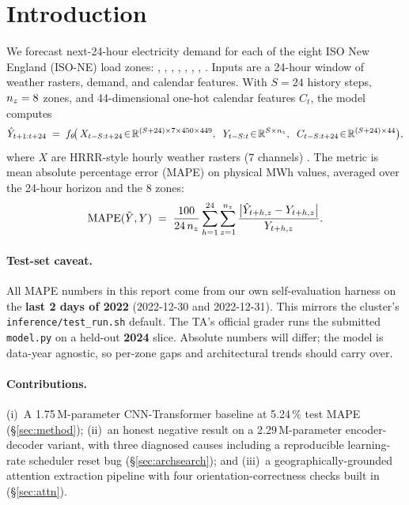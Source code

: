 \documentclass[11pt,letterpaper]{article}
\begin{document}
\maketitle
\thispagestyle{empty}

\section{Introduction}
\label{sec:intro}

We forecast next-24-hour electricity demand for each of the eight ISO New England (ISO-NE) load zones: , , , , , , , . Inputs are a 24-hour window of weather rasters, demand, and calendar features. With $S=24$ history steps, $n_{z}=8$ zones, and 44-dimensional one-hot calendar features $C_t$, the model computes
\begin{equation}
    \hat Y_{t+1:t+24} \;=\; f_\theta\!\bigl(\, X_{t-S:t+24}\!\in\!\mathbb{R}^{(S+24)\times 7\times 450\times 449},\;\; Y_{t-S:t}\!\in\!\mathbb{R}^{S\times n_{z}},\;\; C_{t-S:t+24}\!\in\!\mathbb{R}^{(S+24)\times 44}\bigr),
    \label{eq:task}
\end{equation}
where $X$ are HRRR-style hourly weather rasters (7 channels) \citep{benjamin2016hrrr}. The metric is mean absolute percentage error (MAPE) on physical MWh values, averaged over the 24-hour horizon and the 8 zones:
\begin{equation}
    \mathrm{MAPE}(\hat Y, Y) \;=\; \frac{100}{24\,n_{z}}\sum_{h=1}^{24}\sum_{z=1}^{n_{z}}\frac{\bigl|\hat Y_{t+h,z}-Y_{t+h,z}\bigr|}{Y_{t+h,z}}.
    \label{eq:mape}
\end{equation}

\paragraph{Test-set caveat.} All MAPE numbers in this report come from our own self-evaluation harness on the \textbf{last 2 days of 2022} (2022-12-30 and 2022-12-31). This mirrors the cluster's \texttt{inference/test\_run.sh} default. The TA's official grader runs the submitted \texttt{model.py} on a held-out \textbf{2024} slice. Absolute numbers will differ; the model is data-year agnostic, so per-zone gaps and architectural trends should carry over.

\paragraph{Contributions.} (i)~A 1.75\,M-parameter CNN-Transformer baseline at 5.24\,\% test MAPE (\S\ref{sec:method}); (ii)~an honest negative result on a 2.29\,M-parameter encoder-decoder variant, with three diagnosed causes including a reproducible learning-rate scheduler reset bug (\S\ref{sec:archsearch}); and (iii)~a geographically-grounded attention extraction pipeline with four orientation-correctness checks built in (\S\ref{sec:attn}).
\end{document}
